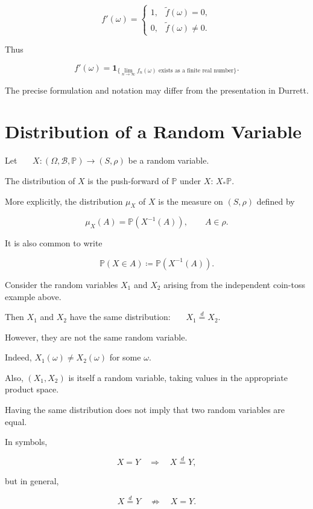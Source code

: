 \[
f'(\omega)
=
\begin{cases}
1,
&
\widetilde f(\omega)=0,\\
0,
&
\widetilde f(\omega)\neq0.
\end{cases}
\]

Thus

\[
f'(\omega)
=
\mathbf{1}_{\{
\lim_{n\to\infty}f_n(\omega)
\text{ exists as a finite real number}
\}}.
\]

\begin{remark}

The precise formulation and notation may differ from the presentation
in Durrett.

\end{remark}

\section{Distribution of a Random Variable}

Let~~~
\(
X:
(\Omega,\mathcal{B},\mathbb{P})
\longrightarrow
(S,\rho)
\)
be a random variable.

The distribution of $X$ is the push-forward of $\mathbb{P}$ under $X$:
\(
X_*\mathbb{P}.
\)

More explicitly, the distribution $\mu_X$ of $X$ is the measure on
$(S,\rho)$ defined by

\[
\mu_X(A)
=
\mathbb{P}\left(X^{-1}(A)\right),
\qquad
A\in\rho.
\]

It is also common to write

\[
\mathbb{P}(X\in A)
\coloneqq
\mathbb{P}\left(X^{-1}(A)\right).
\]


Consider the random variables $X_1$ and $X_2$ arising from the
independent coin-toss example above.

Then $X_1$ and $X_2$ have the same distribution:~~~
\(
X_1\overset{d}{=}X_2.
\)

However, they are not the same random variable.

Indeed,
\(
X_1(\omega)
\neq
X_2(\omega)
\)
for some $\omega$.

Also,
\(
(X_1,X_2)
\)
is itself a random variable, taking values in the appropriate product
space.

\begin{remark}

Having the same distribution does not imply that two random variables
are equal.

In symbols,

\[
X=Y
\quad\Longrightarrow\quad
X\overset{d}{=}Y,
\]

but in general,

\[
X\overset{d}{=}Y
\quad\not\Longrightarrow\quad
X=Y.
\]

\end{remark}

